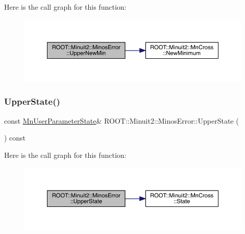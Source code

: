 Here is the call graph for this function\+:
\nopagebreak
\begin{figure}[H]
\begin{center}
\leavevmode
\includegraphics[width=350pt]{d2/dd1/classROOT_1_1Minuit2_1_1MinosError_a5f37bb106903e148029b8461f9bbbe25_cgraph}
\end{center}
\end{figure}
\mbox{\label{classROOT_1_1Minuit2_1_1MinosError_a89164c38dd7596c3164f1083eb9aac72}} 
\subsubsection{\texorpdfstring{UpperState()}{UpperState()}\hspace{0.1cm}{\footnotesize\ttfamily [1/2]}}
{\footnotesize\ttfamily const \mbox{\hyperlink{classROOT_1_1Minuit2_1_1MnUserParameterState}{Mn\+User\+Parameter\+State}}\& R\+O\+O\+T\+::\+Minuit2\+::\+Minos\+Error\+::\+Upper\+State (\begin{DoxyParamCaption}{ }\end{DoxyParamCaption}) const\hspace{0.3cm}{\ttfamily [inline]}}

Here is the call graph for this function\+:
\nopagebreak
\begin{figure}[H]
\begin{center}
\leavevmode
\includegraphics[width=350pt]{d2/dd1/classROOT_1_1Minuit2_1_1MinosError_a89164c38dd7596c3164f1083eb9aac72_cgraph}
\end{center}
\end{figure}
\mbox{\label{classROOT_1_1Minuit2_1_1MinosError_a89164c38dd7596c3164f1083eb9aac72}} 
